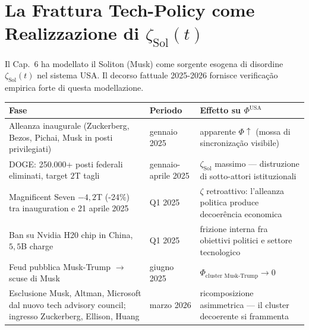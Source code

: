 \section{\texorpdfstring{La Frattura Tech-Policy come Realizzazione di
\(\zeta_{\text{Sol}}(t)\)}{La Frattura Tech-Policy come Realizzazione di \textbackslash zeta\_\{\textbackslash text\{Sol\}\}(t)}}\label{la-frattura-tech-policy-come-realizzazione-di-zeta_textsolt}

Il Cap.~6 ha modellato il Soliton (Musk) come sorgente esogena di
disordine \(\zeta_{\text{Sol}}(t)\) nel sistema USA. Il decorso fattuale
2025-2026 fornisce verificação empirica forte di questa modellazione.

{\def\LTcaptype{none} %
{\small\begin{longtable}[]{@{}
  >{\raggedright\arraybackslash}p{}
  >{\raggedright\arraybackslash}p{}
  >{\raggedright\arraybackslash}p{}@{}}
\toprule\noalign{}
\begin{minipage}[b]{\linewidth}\raggedright
Fase
\end{minipage} & \begin{minipage}[b]{\linewidth}\raggedright
Periodo
\end{minipage} & \begin{minipage}[b]{\linewidth}\raggedright
Effetto su \(\Phi^{\text{USA}}\)
\end{minipage} \\
\midrule\noalign{}
\endhead
\bottomrule\noalign{}
\endlastfoot
Alleanza inaugurale (Zuckerberg, Bezos, Pichai, Musk in posti
privilegiati) & 20 gennaio 2025 & apparente \(\Phi \uparrow\) (mossa di
sincronização visibile) \\
DOGE: 250.000+ posti federali eliminati, target \(2\)T tagli &
gennaio-aprile 2025 & \(\zeta_{\text{Sol}}\) massimo --- distruzione di
sotto-attori istituzionali \\
Magnificent Seven \(-4{,}2\)T (-24\%) tra inauguration e 21 aprile 2025
& Q1 2025 & \(\zeta\) retroattivo: l'alleanza politica produce
decoerência economica \\
Ban su Nvidia H20 chip in China, \(5{,}5\)B charge & Q1 2025 & frizione
interna fra obiettivi politici e settore tecnologico \\
Feud pubblica Musk-Trump $\to$ scuse di Musk & giugno 2025 &
\(\Phi_{\text{cluster Musk-Trump}} \to 0\) \\
Esclusione Musk, Altman, Microsoft dal nuovo tech advisory council;
ingresso Zuckerberg, Ellison, Huang & marzo 2026 & ricomposizione
asimmetrica --- il cluster decoerente si frammenta \\
\end{longtable}}
}

